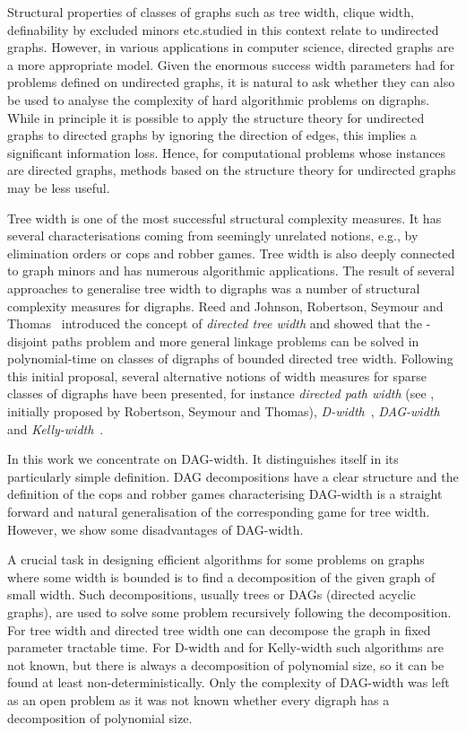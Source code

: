 \documentclass[authoryear]{article}
\theoremstyle{definition}
\newcommand{\0}{\emptyset}
\newcommand{\tw}{tree {}width\xspace}
\newcommand{\Tw}{Tree {}width\xspace}
\newcommand{\dtw}{directed tree {}width\xspace}
\newcommand{\dagw}{DAG-{}width\xspace}
\newcommand{\kw}{Kelly-{}width\xspace}
\newcommand{\dw}{D-{}width\xspace}
\newcommand{\eg}{e.g.,\xspace}
\begin{document}
Structural properties of classes of graphs such as tree width, clique
width, definability by excluded minors etc.\@ studied in this context relate to
undirected graphs.
However, in various applications in computer science, directed graphs are
a more appropriate model. 
Given the enormous success
width parameters 
had for problems defined on undirected graphs, it is natural to ask
whether they can also be used to analyse the complexity of hard
algorithmic problems
on digraphs.
While in principle it is 
possible to apply the structure theory for undirected graphs to directed
graphs by ignoring the direction of edges, this implies a significant
information loss. Hence,
for computational problems whose instances are directed graphs,  
methods based on the structure theory for undirected graphs may be
less useful.

\Tw is one of the most successful structural complexity measures. It has several
characterisations coming from seemingly unrelated notions, \eg by
elimination orders or cops and robber games. \Tw is also deeply
connected to graph minors and has numerous algorithmic applications.
The result of several approaches to generalise \tw to digraphs was a
number of structural complexity measures for digraphs. 
Reed \cite{Reed99} and Johnson, Robertson, Seymour and
Thomas~\cite{JohnsonRobSeyTho01} introduced the
concept of \emph{directed tree width} and showed that the -disjoint
paths problem and more general linkage problems can be solved in
polynomial-time on classes of digraphs of bounded directed
tree width. Following this initial proposal, several alternative
notions of width measures for sparse classes of digraphs have been
presented, for instance \emph{directed path width} (see
\cite{Barat06}, initially proposed by Robertson, Seymour and Thomas),
\emph{D-width}~\cite{Safari05},
\emph{DAG-width}~\cite{BerwangerDawHunKreObd12} and
\emph{Kelly-width}~\cite{HunterKre08}. 

In this work we concentrate on \dagw. It distinguishes itself in its
particularly simple definition. DAG decompositions have a clear
structure and the definition of the cops and robber games
characterising \dagw is a straight forward and natural generalisation
of the corresponding game for \tw. However, we show some disadvantages
of \dagw.






A crucial task in designing efficient algorithms for some problems on graphs where some
width is bounded is to find a decomposition of the given graph of
small width. Such decompositions, usually trees or DAGs (directed acyclic graphs), are used to
solve some problem recursively following the decomposition. For \tw and
\dtw one can decompose the graph in fixed parameter tractable
time. For \dw and for \kw such algorithms are not known, but there is
always a decomposition of polynomial size, so it can be found at least
 non-deterministically. 
Only the complexity of \dagw was left as an open problem
as it was not known whether every digraph has a decomposition of
polynomial size.
\end{document}

